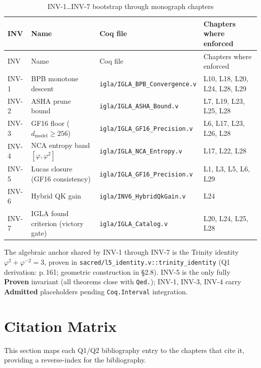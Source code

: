 \begin{longtable}{lp{4cm}p{3.5cm}p{4cm}}
\toprule
INV & Name & Coq file & Chapters where enforced \\
\midrule
\endfirsthead
\toprule
INV & Name & Coq file & Chapters where enforced \\
\midrule
\endhead
\bottomrule
\endfoot
\bottomrule
\caption{INV-1\dots INV-7 bootstrap through monograph chapters}
\endlastfoot
INV-1 & BPB monotone descent &
  \texttt{igla/IGLA\_BPB\_Convergence.v} &
  L10, L18, L20, L24, L28, L29 \\
INV-2 & ASHA prune bound &
  \texttt{igla/IGLA\_ASHA\_Bound.v} &
  L7, L19, L23, L25, L28 \\
INV-3 & GF16 floor ($d_{\text{model}}\geq 256$) &
  \texttt{igla/IGLA\_GF16\_Precision.v} &
  L6, L17, L23, L26, L28 \\
INV-4 & NCA entropy band $[\varphi,\varphi^{2}]$ &
  \texttt{igla/IGLA\_NCA\_Entropy.v} &
  L17, L22, L28 \\
INV-5 & Lucas closure (GF16 consistency) &
  \texttt{igla/IGLA\_GF16\_Precision.v} &
  L1, L3, L5, L6, L29 \\
INV-6 & Hybrid QK gain &
  \texttt{igla/INV6\_HybridQkGain.v} &
  L24 \\
INV-7 & IGLA found criterion (victory gate) &
  \texttt{igla/IGLA\_Catalog.v} &
  L20, L24, L25, L28 \\
\end{longtable}

\noindent
The algebraic anchor shared by INV-1 through INV-7 is the Trinity
identity $\varphi^{2}+\varphi^{-2}=3$, proven in
\texttt{sacred/l5\_identity.v::trinity\_identity}
(Q1 derivation: \cite{hardy_wright} p.\,161; geometric construction in
\cite{coxeter_regular_polytopes} \S2.8).
INV-5 is the only fully \textbf{Proven} invariant (all theorems close
with \texttt{Qed.}); INV-1, INV-3, INV-4 carry \textbf{Admitted}
placeholders pending \texttt{Coq.Interval} integration.

\section{Citation Matrix}
\label{sec:A-citation-matrix}

This section maps each Q1/Q2 bibliography entry to the chapters that
cite it, providing a reverse-index for the bibliography.

